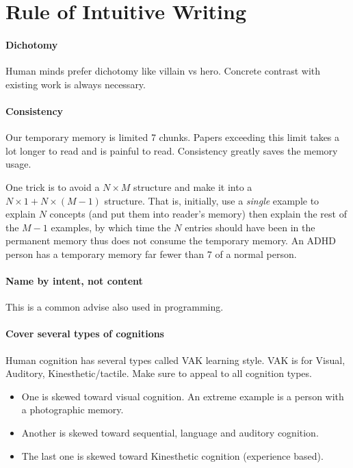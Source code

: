\section{Rule of Intuitive Writing}

\paragraph{Dichotomy}

Human minds prefer dichotomy like villain vs hero.
Concrete contrast with existing work is always necessary.

\paragraph{Consistency}

Our temporary memory is limited 7 chunks.
Papers exceeding this limit takes a lot longer to read and is painful to read.
Consistency greatly saves the memory usage.

One trick is to avoid a $N\times M$ structure and make it into a $N \times 1 + N \times (M-1)$ structure.
That is, initially, use a \emph{single} example to explain $N$ concepts (and put them into reader's memory)
then explain the rest of the $M-1$ examples, by which time the $N$ entries should have been in the permanent memory
thus does not consume the temporary memory.
An ADHD person has a temporary memory far fewer than 7 of a normal person.


\paragraph{Name by intent, not content}

This is a common advise also used in programming.

\paragraph{Cover several types of cognitions}

Human cognition has several types called VAK learning style.
VAK is for Visual, Auditory, Kinesthetic/tactile.
Make sure to appeal to all cognition types.

\begin{itemize}
 \item One is skewed toward visual cognition. An extreme example is a person with a photographic memory.
 \item Another is skewed toward sequential, language and auditory cognition.
 \item The last one is skewed toward Kinesthetic cognition (experience based).
\end{itemize}

